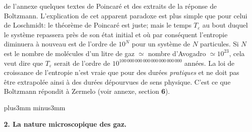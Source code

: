 de l'annexe quelques textes de Poincar\'e et des extraits de la r\'eponse 
de Boltzmann.
\medskip
L'explication de cet apparent paradoxe est plus simple que pour celui 
de Loschmidt: le th\'eor\`eme de Poincar\'e est juste; mais le temps
$T_{\varepsilon}$ au bout duquel le syst\`eme repassera pr\`es de son 
\'etat initial et o\`u par cons\'equent l'entropie diminuera \`a nouveau 
est de l'ordre de $10^N$ pour un syst\`eme de $N$ particules. Si $N$ est 
le nombre de mol\'ecules d'un litre de gaz $\simeq$ nombre d'Avogadro
$\simeq 10^{23}$, cela veut dire que $T_{\varepsilon}$ serait de l'ordre 
de $10^{100\, 000\, 000\, 000\, 000\, 000\, 000\, 000}$ ann\'ees. La loi de 
croissance de l'entropie n'est vraie que pour des dur\'ees {\it pratiques}
et ne doit pas \^etre extrapol\'ee ainsi \`a des dur\'ees d\'epourvues de 
sens physique. C'est ce que Boltzmann r\'epondit \`a Zermelo (voir annexe, 
section {\bf 6}).

\vskip6mm plus3mm minus3mm

{ \bf 2. La nature microscopique des gaz.}

